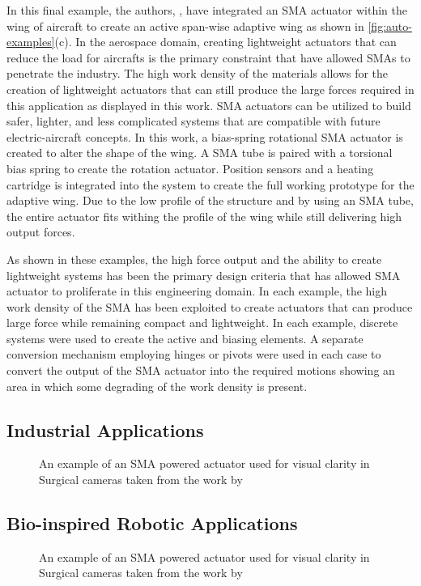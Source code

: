 In this final example, the authors, \todocite, have integrated an SMA actuator within the wing of aircraft to create an active span-wise adaptive wing as shown in \cref{fig:auto-examples}(c). In the aerospace domain, creating lightweight actuators that can reduce the load for aircrafts is the primary constraint that have allowed SMAs to penetrate the industry. The high work density of the materials allows for the creation of lightweight actuators that can still produce the large forces required in this application as displayed in this work. SMA actuators can be utilized to build safer, lighter, and less complicated systems that are compatible with future electric-aircraft concepts. In this work, a bias-spring rotational SMA actuator is created to alter the shape of the wing. A SMA tube is paired with a torsional bias spring to create the rotation actuator. Position sensors and a heating cartridge is integrated into the system to create the full working prototype for the adaptive wing. Due to the low profile of the structure and by using an SMA tube, the entire actuator fits withing the profile of the wing while still delivering high output forces.

As shown in these examples, the high force output and the ability to create lightweight systems has been the primary design criteria that has allowed SMA actuator to proliferate in this engineering domain. In each example, the high work density of the SMA has been exploited to create actuators that can produce large force while remaining compact and lightweight. In each example, discrete systems were used to create the active and biasing elements. A separate conversion mechanism employing hinges or pivots were used in each case to convert the output of the SMA actuator into the required motions showing an area in which some degrading of the work density is present.

\subsection{Industrial Applications}
\begin{figure}[hbt!]
    \centering
    
    \caption{An example of an SMA powered actuator used for visual clarity in Surgical cameras taken from the work by \todocite}
    \label{fig:industrial-examples}
\end{figure}

\subsection{Bio-inspired Robotic Applications}
\begin{figure}[hbt!]
    \centering
    
    \caption{An example of an SMA powered actuator used for visual clarity in Surgical cameras taken from the work by \todocite}
    \label{fig:bio-examples}
\end{figure}

